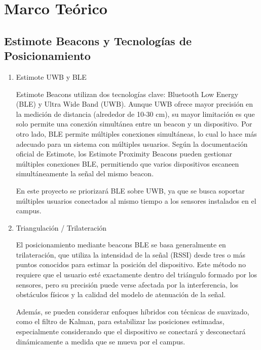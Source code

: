 \documentclass{article}
\begin{document}
\newpage
\section{Marco Teórico}
\subsection{Estimote Beacons y Tecnologías de Posicionamiento}
\begin{enumerate}[label=\thesubsection.\arabic*]
\item  Estimote UWB y BLE  

Estimote Beacons utilizan dos tecnologías clave: Bluetooth Low Energy (BLE) y Ultra Wide Band (UWB). Aunque UWB ofrece mayor precisión en la medición de distancia (alrededor de 10-30 cm), su mayor limitación es que solo permite una conexión simultánea entre un beacon y un dispositivo.
Por otro lado, BLE permite múltiples conexiones simultáneas, lo cual lo hace más adecuado para un sistema con múltiples usuarios. Según la documentación oficial de Estimote, los Estimote Proximity Beacons pueden gestionar múltiples conexiones BLE, permitiendo que varios dispositivos escaneen simultáneamente la señal del mismo beacon.

En este proyecto se priorizará BLE sobre UWB, ya que se busca soportar múltiples usuarios conectados al mismo tiempo a los sensores instalados en el campus.

\item Triangulación / Trilateración

El posicionamiento mediante beacons BLE se basa generalmente en trilateración, que utiliza la intensidad de la señal (RSSI) desde tres o más puntos conocidos para estimar la posición del dispositivo.
Este método no requiere que el usuario esté exactamente dentro del triángulo formado por los sensores, pero su precisión puede verse afectada por la interferencia, los obstáculos físicos y la calidad del modelo de atenuación de la señal.

Además, se pueden considerar enfoques híbridos con técnicas de suavizado, como el filtro de Kalman, para estabilizar las posiciones estimadas, especialmente considerando que el dispositivo se conectará y desconectará dinámicamente a medida que se mueva por el campus.
\end{enumerate}
\end{document}

